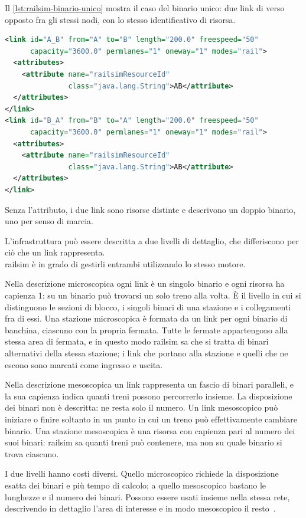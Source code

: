 Il \cref{lst:railsim-binario-unico} mostra il caso del binario unico: due link di verso opposto fra gli stessi nodi, con lo stesso identificativo di risorsa.

\begin{lstlisting}[language=XML,caption={Binario unico percorribile nei due sensi.},label={lst:railsim-binario-unico}]
<link id="A_B" from="A" to="B" length="200.0" freespeed="50"
      capacity="3600.0" permlanes="1" oneway="1" modes="rail">
  <attributes>
    <attribute name="railsimResourceId"
               class="java.lang.String">AB</attribute>
  </attributes>
</link>
<link id="B_A" from="B" to="A" length="200.0" freespeed="50"
      capacity="3600.0" permlanes="1" oneway="1" modes="rail">
  <attributes>
    <attribute name="railsimResourceId"
               class="java.lang.String">AB</attribute>
  </attributes>
</link>
\end{lstlisting}

Senza l'attributo, i due link sono risorse distinte e descrivono un doppio binario, uno per senso di marcia.

L'infrastruttura può essere descritta a due livelli di dettaglio, che differiscono per ciò che un link rappresenta. \\
railsim è in grado di gestirli entrambi utilizzando lo stesso motore.

Nella descrizione microscopica ogni link è un singolo binario e ogni risorsa ha capienza 1: su un binario può trovarsi un solo treno alla volta. È il livello in cui si distinguono le sezioni di blocco, i singoli binari di una stazione e i collegamenti fra di essi. Una stazione microscopica è formata da un link per ogni binario di banchina, ciascuno con la propria fermata. Tutte le fermate appartengono alla stessa area di fermata, e in questo modo railsim sa che si tratta di binari alternativi della stessa stazione; i link che portano alla stazione e quelli che ne escono sono marcati come ingresso e uscita.

Nella descrizione mesoscopica un link rappresenta un fascio di binari paralleli, e la sua capienza indica quanti treni possono percorrerlo insieme. La disposizione dei binari non è descritta: ne resta solo il numero. Un link mesoscopico può iniziare o finire soltanto in un punto in cui un treno può effettivamente cambiare binario. Una stazione mesoscopica è una risorsa con capienza pari al numero dei suoi binari: railsim sa quanti treni può contenere, ma non su quale binario si trova ciascuno.

I due livelli hanno costi diversi. Quello microscopico richiede la disposizione esatta dei binari e più tempo di calcolo; a quello mesoscopico bastano le lunghezze e il numero dei binari. Possono essere usati insieme nella stessa rete, descrivendo in dettaglio l'area di interesse e in modo mesoscopico il resto~\cite{kaddoura2024railsim}.

